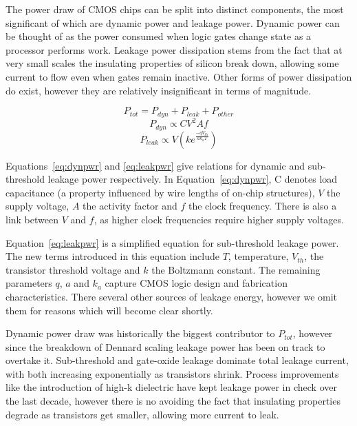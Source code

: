 The power draw of CMOS chips can be split into distinct components, the most significant of which are dynamic power and leakage power. Dynamic power can be thought of as the power consumed when logic gates change state as a processor performs work. Leakage power dissipation stems from the fact that at very small scales the insulating properties of silicon break down, allowing some current to flow even when gates remain inactive. Other forms of power dissipation do exist, however they are relatively insignificant in terms of magnitude. 




\begin{equation}
\label{eq:totpwr}
P_{tot} = P_{dyn} + P_{leak} + P_{other}
\end{equation}
\begin{equation} 
\label{eq:dynpwr}
P_{dyn} \propto CV^{2}Af
\end{equation}
\begin{equation}
\label{eq:leakpwr}
P_{leak} \propto V\left(ke^{\frac{-qV_{th}}{ak_{a}T}}\right)
\end{equation}

Equations~\ref{eq:dynpwr} and \ref{eq:leakpwr} give relations for dynamic and sub-threshold leakage power respectively. In Equation~\ref{eq:dynpwr}, C denotes load capacitance (a property influenced by wire lengths of on-chip structures), $V$ the supply voltage, $A$ the activity factor and $f$ the clock frequency. There is also a link between $V$ and $f$, as higher clock frequencies require higher supply voltages.

Equation~\ref{eq:leakpwr} is a simplified equation for sub-threshold leakage power. The new terms introduced in this equation include $T$, temperature, $V_{th}$, the transistor threshold voltage and $k$ the Boltzmann constant. The remaining parameters $q$, $a$ and $k_{a}$ capture CMOS logic design and fabrication characteristics. There several other sources of leakage energy, however we omit them for reasons which will  become clear shortly.

Dynamic power draw was historically the biggest contributor to $P_{tot}$, however since the breakdown of Dennard scaling leakage power has been on track to overtake it.  Sub-threshold and gate-oxide leakage dominate total leakage current, with both increasing exponentially as transistors shrink. Process improvements like the introduction of high-k dielectric have kept leakage power in check over the last decade, however there is no avoiding the fact that insulating properties degrade as transistors get smaller, allowing more current to leak.


